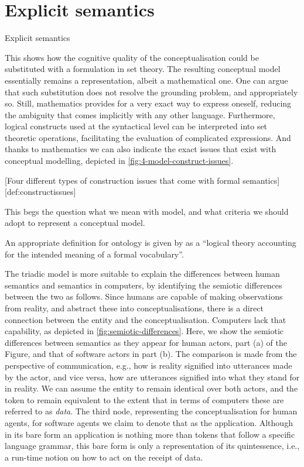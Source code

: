 \documentclass[a4paper,11pt,oneside,oldfontcommands]{memoir}
\theoremstyle{definition}
\theoremstyle{break}		%
\numberwithin{equation}{chapter}
\numberwithin{figure}{chapter}
\begin{document}
\hypertarget{explicit-semantics}{%
\section{Explicit semantics}\label{explicit-semantics}}

Explicit semantics

This shows how the cognitive quality of the conceptualisation could be
substituted with a formulation in set theory. The resulting conceptual
model essentially remains a representation, albeit a mathematical one.
One can argue that such substitution does not resolve the grounding
problem, and appropriately so. Still, mathematics provides for a very
exact way to express oneself, reducing the ambiguity that comes
implicitly with any other language. Furthermore, logical constructs used
at the syntactical level can be interpreted into set theoretic
operations, facilitating the evaluation of complicated expressions. And
thanks to mathematics we can also indicate the exact issues that exist
with conceptual modelling, depicted in
\cref{fig:4-model-construct-issues}.

{[}Four different types of construction issues that come with formal
semantics{]}{[}def:constructissues{]}

This begs the question what we mean with model, and what criteria we
should adopt to represent a conceptual model.

An appropriate definition for ontology is given by \cite{Guarino:1998wq}
as a ``logical theory accounting for the intended meaning of a formal
vocabulary''.

The triadic model is more suitable to explain the differences between
human semantics and semantics in computers, by identifying the semiotic
differences between the two as follows. Since humans are capable of
making observations from reality, and abstract these into
conceptualisations, there is a direct connection between the entity and
the conceptualisation. Computers lack that capability, as depicted in
\cref{fig:semiotic-differences}. Here, we show the semiotic differences
between semantics as they appear for human actors, part (a) of the
Figure, and that of software actors in part (b). The comparison is made
from the perspective of communication, e.g., how is reality signified
into utterances made by the actor, and vice versa, how are utterances
signified into what they stand for in reality. We can assume the entity
to remain identical over both actors, and the token to remain equivalent
to the extent that in terms of computers these are referred to as
\emph{data}. The third node, representing the conceptualisation for
human agents, for software agents we claim to denote that as the
application. Although in its bare form an application is nothing more
than tokens that follow a specific language grammar, this bare form is
only a representation of its quintessence, i.e., a run-time notion on
how to act on the receipt of data.
\end{document}

